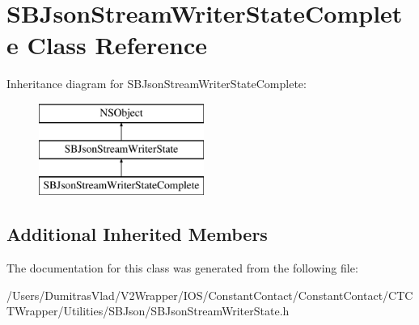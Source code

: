 \hypertarget{interface_s_b_json_stream_writer_state_complete}{\section{S\-B\-Json\-Stream\-Writer\-State\-Complete Class Reference}
\label{interface_s_b_json_stream_writer_state_complete}
}
Inheritance diagram for S\-B\-Json\-Stream\-Writer\-State\-Complete\-:\begin{figure}[H]
\begin{center}
\leavevmode
\includegraphics[height=3.000000cm]{interface_s_b_json_stream_writer_state_complete}
\end{center}
\end{figure}
\subsection*{Additional Inherited Members}


The documentation for this class was generated from the following file\-:\begin{DoxyCompactItemize}
\item 
/\-Users/\-Dumitras\-Vlad/\-V2\-Wrapper/\-I\-O\-S/\-Constant\-Contact/\-Constant\-Contact/\-C\-T\-C\-T\-Wrapper/\-Utilities/\-S\-B\-Json/S\-B\-Json\-Stream\-Writer\-State.\-h\end{DoxyCompactItemize}
